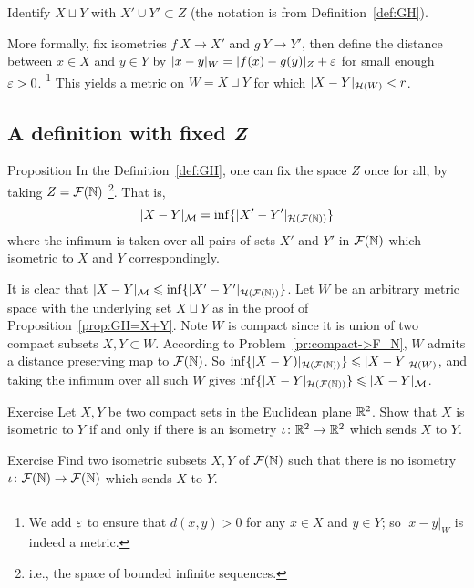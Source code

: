 Identify $X\sqcup Y$ with $X'\cup Y' \subset Z$ 
(the notation
is from Definition~\ref{def:GH}). 

More formally, fix isometries $f\: X \to X'$ and
$g\: Y \to Y'$, then define the distance between $x \in X$ and $y \in Y$ by
$|x-y|_W = |f (x)- g(y)|_Z+\varepsilon$ for small enough $\varepsilon>0$.%
\footnote{We add $\varepsilon$ to ensure that $d(x, y) > 0$ for any $x\in X$ and $y\in Y$;
so $|x-y|_W$ is indeed a metric.}
This yields a metric on $W=X\sqcup Y$ for which
$|X- Y|_{\mathcal{H}(W)} \z< r$.
\qeds
 



\subsection*{A definition with fixed \textit{Z}}

\begin{thm}{Proposition}\label{prop:GH-with-fixed-Z}
In the Definition~\ref{def:GH}, 
one can fix the space $Z$ once for all, by taking $Z=\mathcal{F}(\mathbb{N})$%
\footnote{i.e., the space of bounded infinite sequences.}.  
That is, 
$$|X-Y|_{\mathcal{M}} = \inf \{|X'-Y'|_{\mathcal{H}(\mathcal{F}(\mathbb{N}))}\}$$ 
where the infimum is taken over all pairs of sets $X'$ and $Y'$ in $\mathcal{F}(\mathbb{N})$
which isometric to  $X$ and $Y$ correspondingly.  
\end{thm}

It is clear that $|X-Y|_{\mathcal{M}} \leqslant \inf \{|X'-Y'|_{\mathcal{H}(\mathcal{F}(\mathbb{N}))}\}$.  
Let $W$ be an arbitrary metric space with the underlying set $X\sqcup Y$ as in the proof of Proposition~\ref{prop:GH=X+Y}.
Note $W$ is compact since it is union of two compact subsets $X,Y\subset W$.
According to Problem~\ref{pr:compact->F_N},
$W$ admits a distance preserving map to $\mathcal{F}(\mathbb{N})$.
So $\inf \{|X-Y)|_{\mathcal{H}(\mathcal{F}(\mathbb{N}))}\} \leqslant |X-Y|_{\mathcal{H}(W)}$, and taking the infimum over all such $W$ gives $\inf \{|X-Y|_{\mathcal{H}(\mathcal{F}(\mathbb{N}))} \}\leqslant |X-Y|_{\mathcal{M}}$.
\qeds

\begin{thm}{Exercise}\label{ex:euclid-isom}
Let $X,Y$ be two compact sets in the Euclidean plane $\mathbb{R}^2$.
Show that $X$ is isometric to $Y$ if and only if there is an isometry $\iota\colon\mathbb{R}^2\to \mathbb{R}^2$
which sends $X$ to $Y$.
\end{thm}

\begin{thm}{Exercise}\label{ex:mink-isom}
Find two isometric subsets $X,Y$ of $\mathcal{F}(\mathbb{N})$
such that there is no isometry $\iota\colon\mathcal{F}(\mathbb{N})\to \mathcal{F}(\mathbb{N})$ 
which sends $X$ to $Y$.
\end{thm}

